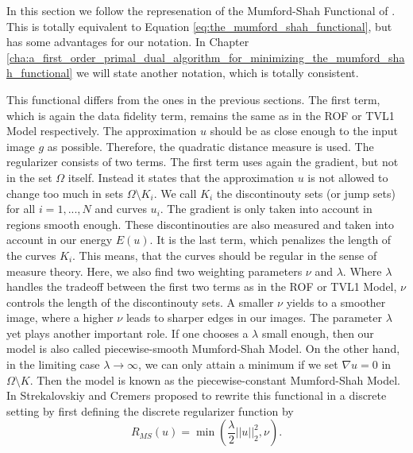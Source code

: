     \begin{remark}
        In this section we follow the represenation of the Mumford-Shah Functional of \cite{Strekalovskiy-Cremers-eccv14}. This is totally equivalent to Equation \ref{eq:the_mumford_shah_functional}, but has some advantages for our notation. In Chapter \ref{cha:a_first_order_primal_dual_algorithm_for_minimizing_the_mumford_shah_functional} we will state another notation, which is totally consistent.
    \end{remark}

    This functional differs from the ones in the previous sections. The first term, which is again the data fidelity term, remains the same as in the ROF or TVL1 Model respectively. The approximation $u$ should be as close enough to the input image $g$ as possible. Therefore, the quadratic distance measure is used. The regularizer consists of two terms. The first term uses again the gradient, but not in the set $\Omega$ itself. Instead it states that the approximation $u$ is not allowed to change too much in sets $\Omega \setminus K_{i}$. We call $K_{i}$ the discontinouty sets (or jump sets) for all $i = 1, ..., N$ and curves $u_{i}$. The gradient is only taken into account in regions smooth enough. These discontinouties are also measured and taken into account in our energy $E(u)$. It is the last term, which penalizes the length of the curves $K_{i}$. This means, that the curves should be regular in the sense of measure theory. Here, we also find two weighting parameters $\nu$ and $\lambda$. Where $\lambda$ handles the tradeoff between the first two terms as in the ROF or TVL1 Model, $\nu$ controls the length of the discontinouty sets. A smaller $\nu$ yields to a smoother image, where a higher $\nu$ leads to sharper edges in our images. The parameter $\lambda$ yet plays another important role. If one chooses a $\lambda$ small enough, then our model is also called piecewise-smooth Mumford-Shah Model. On the other hand, in the limiting case $\lambda \longrightarrow \infty$, we can only attain a minimum if we set $\nabla u = 0$ in $\Omega \setminus K$. Then the model is known as the piecewise-constant Mumford-Shah Model.
    In \cite{Strekalovskiy-Cremers-eccv14} Strekalovskiy and Cremers proposed to rewrite this functional in a discrete setting by first defining the discrete regularizer function by
        \begin{equation}
            R_{MS}(u) = \min(\frac{\lambda}{2}||u||_{2}^{2},\nu).
        \label{eq:ms_regularizer}
        \end{equation}
